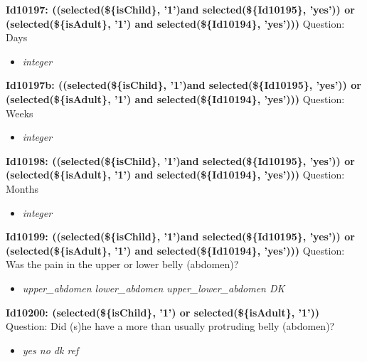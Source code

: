 \documentclass{article}%
\begin{document}
\textbf{Id10197: ((selected(\$\{isChild\}, '1')and selected(\$\{Id10195\}, 'yes')) or (selected(\$\{isAdult\}, '1') and selected(\$\{Id10194\}, 'yes')))\newline%
}%
Question: Days\newline%
%
\begin{itemize}%
\item%
\textit{integer\newline%
}%
\end{itemize}%
\textbf{Id10197b: ((selected(\$\{isChild\}, '1')and selected(\$\{Id10195\}, 'yes')) or (selected(\$\{isAdult\}, '1') and selected(\$\{Id10194\}, 'yes')))\newline%
}%
Question: Weeks\newline%
%
\begin{itemize}%
\item%
\textit{integer\newline%
}%
\end{itemize}%
\textbf{Id10198: ((selected(\$\{isChild\}, '1')and selected(\$\{Id10195\}, 'yes')) or (selected(\$\{isAdult\}, '1') and selected(\$\{Id10194\}, 'yes')))\newline%
}%
Question: Months\newline%
%
\begin{itemize}%
\item%
\textit{integer\newline%
}%
\end{itemize}%
\textbf{Id10199: ((selected(\$\{isChild\}, '1')and selected(\$\{Id10195\}, 'yes')) or (selected(\$\{isAdult\}, '1') and selected(\$\{Id10194\}, 'yes')))\newline%
}%
Question: Was the pain in the upper or lower belly (abdomen)?\newline%
%
\begin{itemize}%
\item%
\textit{upper\_abdomen\newline%
 lower\_abdomen\newline%
 upper\_lower\_abdomen\newline%
 DK\newline%
}%
\end{itemize}%
\textbf{Id10200: (selected(\$\{isChild\}, '1') or selected(\$\{isAdult\}, '1')) \newline%
}%
Question: Did (s)he have a more than usually protruding belly (abdomen)?\newline%
%
\begin{itemize}%
\item%
\textit{yes\newline%
 no\newline%
 dk\newline%
 ref\newline%
}%
\end{itemize}%
\end{document}
